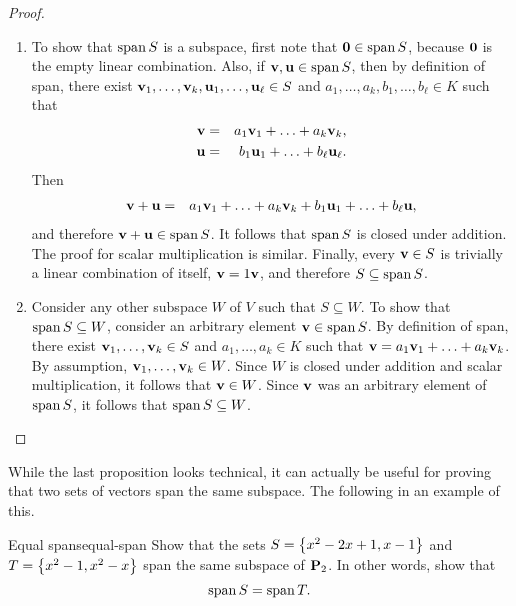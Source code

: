\begin{proof}
  \begin{enumialphparenastyle}
    \begin{enumerate}
    \item To show that $\sspan S$ is a subspace, first note that
      $\vect{0}\in\sspan S$, because $\mbox{\bf 0}$ is the empty linear
      combination. Also, if $\vect{v},\vect{u}\in\sspan S$, then by
      definition of span, there exist
      $\mbox{\bf v}_1,\ldots,\mbox{\bf v}_k,\mbox{\bf u}_1,\ldots,\mbox{\bf u}_{\ell}\in
      S$ and $a_1,\ldots,a_k,b_1,\ldots,b_{\ell}\in K$ such that
      \begin{eqnarray*}
        \mbox{\bf v} &=& a_1\mbox{\bf v}_1 + \ldots + a_k\mbox{\bf v}_k, \\
        \mbox{\bf u} &=& b_1\mbox{\bf u}_1 + \ldots + b_{\ell}\mbox{\bf u}_{\ell}.
      \end{eqnarray*}
      Then
      \begin{eqnarray*}
        \mbox{\bf v}+\mbox{\bf u}
        &=& a_1\mbox{\bf v}_1 + \ldots + a_k\mbox{\bf v}_k
            + b_1\mbox{\bf u}_1 + \ldots + b_{\ell}\mbox{\bf u},
      \end{eqnarray*}
      and therefore $\vect{v}+\vect{u}\in\sspan S$. It follows that
      $\sspan S$ is closed under addition. The proof for scalar
      multiplication is similar. Finally, every $\mbox{\bf v}\in S$ is
      trivially a linear combination of itself, $\mbox{\bf v}=1\mbox{\bf v}$,
      and therefore $S\subseteq \sspan S$.
    \item Consider any other subspace $W$ of $V$ such that
      $S\subseteq W$. To show that $\sspan S\subseteq W$, consider an
      arbitrary element $\vect{v}\in\sspan S$. By definition of span,
      there exist $\mbox{\bf v}_1,\ldots,\mbox{\bf v}_k\in S$ and
      $a_1,\ldots,a_k\in K$ such that
      $\mbox{\bf v}=a_1\mbox{\bf v}_1 + \ldots + a_k\mbox{\bf v}_k$. By
      assumption, $\mbox{\bf v}_1,\ldots,\mbox{\bf v}_k\in W$. Since $W$ is
      closed under addition and scalar multiplication, it follows that
      $\mbox{\bf v}\in W$. Since $\mbox{\bf v}$ was an arbitrary element of
      $\sspan S$, it follows that $\sspan S\subseteq W$.      
    \end{enumerate}
  \end{enumialphparenastyle}
\end{proof}

While the last proposition looks technical, it can actually be useful
for proving that two sets of vectors span the same subspace. The
following in an example of this.

\begin{example}{Equal spans}{equal-span}
  Show that the sets $S=\left\{x^2-2x+1, x-1\right\}$ and
  $T=\left\{x^2-1, x^2-x\right\}$ span the same subspace of $\mathbf{P}_2$. In other
  words, show that
  \begin{equation*}
    \sspan S = \sspan T.
  \end{equation*}
\end{example}

